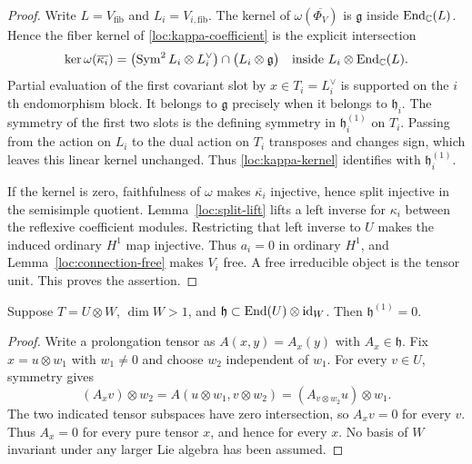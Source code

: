 \begin{proof}
Write $L=V_{\mathrm{fib}}$ and $L_i=V_{i,\mathrm{fib}}$.
The kernel of $\omega(\overline{\Phi_V})$ is $\mathfrak g$ inside
$\operatorname{End}_{\mathbb C}(L)$.  Hence the fiber kernel of
\eqref{loc:kappa-coefficient} is the explicit intersection
\begin{equation}\label{loc:kappa-kernel}
 \ker\omega(\overline{\kappa_i})=
 \bigl(\operatorname{Sym}^2L_i\otimes L_i^\vee\bigr)
          \cap\bigl(L_i\otimes\mathfrak g\bigr)
       \quad\text{inside }L_i\otimes\operatorname{End}_{\mathbb C}(L).
\end{equation}
Partial evaluation of the first covariant slot by $x\in T_i=L_i^\vee$
is supported on the $i$th endomorphism block.  It belongs to
$\mathfrak g$ precisely when it belongs to $\mathfrak h_i$.
The symmetry of the first two slots is the defining symmetry in
$\mathfrak h_i^{(1)}$ on $T_i$.  Passing from the action on $L_i$
to the dual action on $T_i$ transposes and changes sign, which leaves
this linear kernel unchanged.  Thus \eqref{loc:kappa-kernel} identifies
with $\mathfrak h_i^{(1)}$.

If the kernel is zero, faithfulness of $\omega$ makes
$\overline{\kappa_i}$ injective, hence split injective in the semisimple
quotient.  Lemma~\ref{loc:split-lift} lifts a left inverse for
$\kappa_i$ between the reflexive coefficient modules.  Restricting
that left inverse to $U$ makes the induced ordinary $H^1$ map injective.
Thus $a_i=0$ in ordinary $H^1$, and
Lemma~\ref{loc:connection-free} makes $V_i$ free.  A free
irreducible object is the tensor unit.  This proves the assertion.
\end{proof}

\begin{lemma}
\label{loc:auxiliary-factor}
Suppose $T=U\otimes W$, $\dim W>1$, and
$\mathfrak h\subset\operatorname{End}(U)\otimes\operatorname{id}_W$.  Then
$\mathfrak h^{(1)}=0$.
\end{lemma}

\begin{proof}
Write a prolongation tensor as $A(x,y)=A_x(y)$ with
$A_x\in\mathfrak h$.  Fix $x=u\otimes w_1$ with $w_1\ne0$
and choose $w_2$ independent of $w_1$.  For every $v\in U$,
symmetry gives
\[
 (A_xv)\otimes w_2
   =A(u\otimes w_1,v\otimes w_2)
   =(A_{v\otimes w_2}u)\otimes w_1.
\]
The two indicated tensor subspaces have zero intersection, so
$A_xv=0$ for every $v$.  Thus $A_x=0$ for every pure tensor $x$,
and hence for every $x$.  No basis of $W$ invariant under any
larger Lie algebra has been assumed.
\end{proof}

